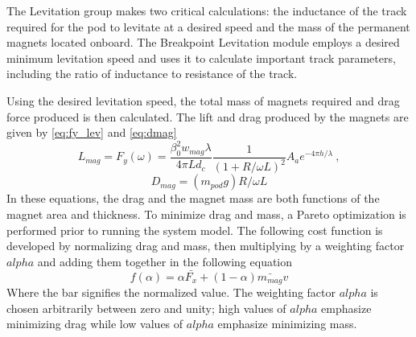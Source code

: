 	The Levitation group makes two critical calculations: the inductance of the
	track required for the pod to levitate at a desired speed and the mass of
	the permanent magnets located onboard. The Breakpoint Levitation module employs a
	desired minimum levitation speed and uses it to calculate important track
	parameters, including the ratio of inductance to resistance of the track.

	Using the desired levitation speed, the total mass of magnets required and
	drag force produced is then calculated. The lift and drag produced
	by the magnets are given by \cref{eq:fy_lev} and \cref{eq:dmag}
	\begin{equation}
		\label{eq:fy_lev}
		L_{mag} = F_{y}(\omega)=\frac{\beta _{0}^{2}w_{mag}\lambda}{4\pi Ld_{c}}\frac{1}{(1+R/\omega L)^{2}}A_ae^{-4\pi h/\lambda } \ ,
	\end{equation}
	\begin{equation}
		\label{eq:dmag}
		D_{mag}=( m_{pod}g)R/\omega L
	\end{equation}
	In these equations, the drag and the magnet mass are both functions of the
	magnet area and thickness. To minimize drag and mass, a Pareto optimization
	is performed prior to running the system model. The following cost function
	is developed by normalizing drag and mass, then multiplying by a weighting
	factor $alpha$ and adding them together in the following equation
	\begin{equation}
		\label{eq:pareto}
		f(\alpha ) = \alpha \bar{F_{x}} + (1-\alpha )\bar{m_{mag}}v
	\end{equation}
	Where the bar signifies the normalized value. The weighting factor $alpha$
	is chosen arbitrarily between zero and unity; high values of $alpha$
	emphasize minimizing drag while low values of $alpha$ emphasize minimizing mass.




